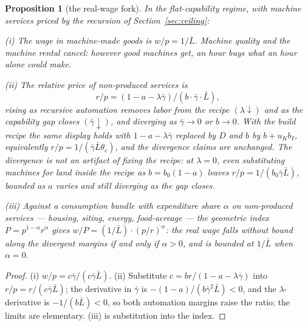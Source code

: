 \documentclass[12pt]{article}
\theoremstyle{plain}
\newtheorem{proposition}{Proposition}
\begin{document}
\begin{proposition}[the real-wage fork]\label{prop:fork}
In the flat-capability regime, with machine services priced by the recursion of Section~\ref{sec:ceiling}:

(i) The wage in machine-made goods is $w/p = 1/\bar{L}$. Machine quality and the machine rental cancel: however good machines get, an hour buys what an hour alone could make.

(ii) The relative price of non-produced services is
\begin{equation}\label{eq:fork-price}
r/p = (1 - a - \lambda \bar{\gamma}) / (b\cdot \bar{\gamma}\cdot \bar{L}),
\end{equation}
rising as recursive automation removes labor from the recipe $(\lambda \downarrow )$ and as the capability gap closes $(\bar{\gamma} \downarrow )$, and diverging as $\bar{\gamma} \to 0$ or $b \to 0$. With the build recipe the same display holds with $1 - a - \lambda \bar{\gamma}$ replaced by $D$ and $b$ by $b + u_K b_I$, equivalently $r/p = 1/(\bar{\gamma}\bar{L}\theta _c)$, and the divergence claims are unchanged. The divergence is not an artifact of fixing the recipe: at $\lambda = 0$, even substituting machines for land inside the recipe as $b = b_0(1-a)$ leaves $r/p = 1/(b_0\bar{\gamma}\bar{L})$, bounded as $a$ varies and still diverging as the gap closes.

(iii) Against a consumption bundle with expenditure share $\alpha$ on non-produced services --- housing, siting, energy, food-acreage --- the geometric index $P = p^{1-\alpha}r^{\alpha}$ gives $w/P = (1/\bar{L})\cdot (p/r)^{\alpha}$: the real wage falls without bound along the divergent margins if and only if $\alpha > 0$, and is bounded at $1/\bar{L}$ when $\alpha = 0$.
\end{proposition}

\begin{proof}
(i) $w/p = c\bar{\gamma}/(c\bar{\gamma}\bar{L})$. (ii) Substitute $c = br/(1-a-\lambda \bar{\gamma})$ into $r/p = r/(c\bar{\gamma}\bar{L})$; the derivative in $\bar{\gamma}$ is $-(1-a)/(b\bar{\gamma}^2\bar{L}) < 0$, and the $\lambda$-derivative is $-1/(b\bar{L}) < 0$, so both automation margins raise the ratio; the limits are elementary. (iii) is substitution into the index.
\end{proof}
\end{document}
